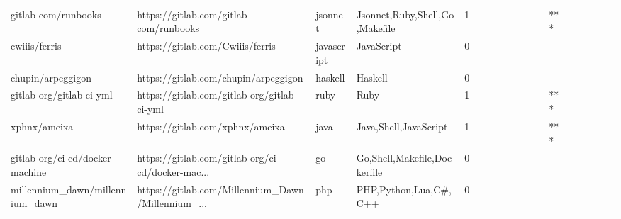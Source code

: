 \begin{tabular}{llllrlllllllllllll}
gitlab-com/runbooks                                &             https://gitlab.com/gitlab-com/runbooks &           jsonnet &                     Jsonnet,Ruby,Shell,Go,Makefile &       1 &         &        &           &                &                 &        &           &       *** &          &          &       &              &          \\
cwiiis/ferris                                      &                   https://gitlab.com/Cwiiis/ferris &        javascript &                                         JavaScript &       0 &         &        &           &                &                 &        &           &           &          &          &       &              &          \\
chupin/arpeggigon                                  &               https://gitlab.com/chupin/arpeggigon &           haskell &                                            Haskell &       0 &         &        &           &                &                 &        &           &           &          &          &       &              &          \\
gitlab-org/gitlab-ci-yml                           &        https://gitlab.com/gitlab-org/gitlab-ci-yml &              ruby &                                               Ruby &       1 &         &        &           &                &                 &        &           &       *** &          &          &       &              &          \\
xphnx/ameixa                                       &                    https://gitlab.com/xphnx/ameixa &              java &                              Java,Shell,JavaScript &       1 &         &        &           &                &                 &        &           &       *** &          &          &       &              &          \\
gitlab-org/ci-cd/docker-machine                    &  https://gitlab.com/gitlab-org/ci-cd/docker-mac... &                go &                       Go,Shell,Makefile,Dockerfile &       0 &         &        &           &                &                 &        &           &           &          &          &       &              &          \\
millennium\_dawn/millennium\_dawn                    &  https://gitlab.com/Millennium\_Dawn/Millennium\_... &               php &                              PHP,Python,Lua,C\#,C++ &       0 &         &        &           &                &                 &        &           &           &          &          &       &              &          \\

\end{tabular}
